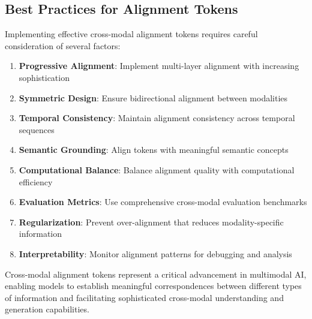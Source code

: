 \subsection{Best Practices for Alignment Tokens}

Implementing effective cross-modal alignment tokens requires careful consideration of several factors:

\begin{enumerate}
\item \textbf{Progressive Alignment}: Implement multi-layer alignment with increasing sophistication
\item \textbf{Symmetric Design}: Ensure bidirectional alignment between modalities
\item \textbf{Temporal Consistency}: Maintain alignment consistency across temporal sequences
\item \textbf{Semantic Grounding}: Align tokens with meaningful semantic concepts
\item \textbf{Computational Balance}: Balance alignment quality with computational efficiency
\item \textbf{Evaluation Metrics}: Use comprehensive cross-modal evaluation benchmarks
\item \textbf{Regularization}: Prevent over-alignment that reduces modality-specific information
\item \textbf{Interpretability}: Monitor alignment patterns for debugging and analysis
\end{enumerate}
\begin{comment}
Feedback: This is a good list. To make it more actionable:
1.  **Progressive Alignment**: "Don't try to force alignment in the very first layer. Allow modality-specific encoders to build up rich representations first, then introduce cross-attention and alignment objectives in the middle or later layers of the model."
2.  **Symmetric Design**: "Your training objectives should be symmetric. If you have a contrastive loss for image-to-text matching, you should also have one for text-to-image matching. This prevents the model from developing a bias towards one modality."
3.  **Regularization**: "Be careful not to force the representations to be *too* similar. Modalities contain unique information that can be lost if the alignment objective is too strong. Use a small weight for the alignment loss relative to other objectives, or use techniques that only align a subset of the features."
\end{comment}

Cross-modal alignment tokens represent a critical advancement in multimodal AI, enabling models to establish meaningful correspondences between different types of information and facilitating sophisticated cross-modal understanding and generation capabilities.
